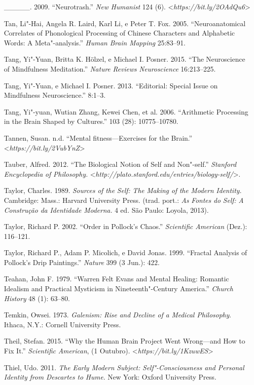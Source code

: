 {\begin{Parskip}
\_\_\_\_\_. 2009. ``Neurotrash.'' \emph{New Humanist} 124 (6).
\textless{}\emph{https://bit.ly/2OAdQu6}\textgreater{}

Tan, Li"-Hai, Angela R. Laird, Karl Li, e Peter T. Fox. 2005.
``Neuroanatomical Correlates of Phonological Processing of Chinese
Characters and Alphabetic Words: A Meta"-analysis.'' \emph{Human Brain
Mapping} 25:83--91.

Tang, Yi"-Yuan, Britta K. Hölzel, e Michael I. Posner. 2015. ``The
Neuroscience of Mindfulness Meditation.'' \emph{Nature Reviews
Neuroscience} 16:213--225.

Tang, Yi"-Yuan, e Michael I. Posner. 2013. ``Editorial: Special Issue on
Mindfulness Neuroscience.'' \emph{} 8:1--3.

Tang, Yi"-yuan, Wutian Zhang, Kewei Chen, et al. 2006. ``Arithmetic
Processing in the Brain Shaped by Cultures.'' \emph{} 103 (28):
10775--10780.

Tannen, Susan. n.d. ``Mental fitness---Exercises for the Brain.''
\textless{}\emph{https://bit.ly/2VubYnZ}\textgreater{}

Tauber, Alfred. 2012. ``The Biological Notion of Self and Non"-self.''
\emph{Stanford Encyclopedia of Philosophy.}
\textless{}\emph{http://plato.stanford.edu/entries/biology-self/}\textgreater{}.

Taylor, Charles. 1989. \emph{Sources of the Self: The Making of the
Modern Identity.} Cambridge: Mass.: Harvard University Press. (trad.
port.: \emph{As Fontes do Self: A Construção da Identidade Moderna.} 4
ed\emph{.} São Paulo: Loyola, 2013).

Taylor, Richard P. 2002. ``Order in Pollock's Chaos.'' \emph{Scientific
American} (Dez.): 116--121.

Taylor, Richard P., Adam P. Micolich, e David Jonas. 1999. ``Fractal
Analysis of Pollock's Drip Paintings.'' \emph{Nature} 399 (3 Jun.): 422.

Teahan, John F. 1979. ``Warren Felt Evans and Mental Healing: Romantic
Idealism and Practical Mysticism in Nineteenth"-Century America.''
\emph{Church History} 48 (1): 63--80.

Temkin, Owsei. 1973. \emph{Galenism: Rise and Decline of a Medical
Philosophy}. Ithaca, N.Y.: Cornell University Press.

Theil, Stefan. 2015. ``Why the Human Brain Project Went Wrong---and How
to Fix It.'' \emph{Scientific American}, (1 Outubro).
\textless{}\emph{https://bit.ly/1KzuwES}\textgreater{}

Thiel, Udo. 2011. \emph{The Early Modern Subject: Self"-Consciousness and
Personal Identity from Descartes to Hume.} New York: Oxford University
Press.


\end{Parskip}}
